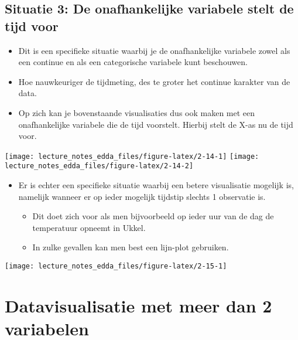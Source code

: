 \documentclass[]{memoir}
\providecommand{\tightlist}{%
  \setlength{\itemsep}{0pt}\setlength{\parskip}{0pt}}
\begin{document}
\subsection{Situatie 3: De onafhankelijke variabele stelt de tijd
voor}\label{situatie-3-de-onafhankelijke-variabele-stelt-de-tijd-voor}

\begin{itemize}
\tightlist
\item
  Dit is een specifieke situatie waarbij je de onafhankelijke variabele
  zowel als een continue en als een categorische variabele kunt
  beschouwen.
\item
  Hoe nauwkeuriger de tijdmeting, des te groter het continue karakter
  van de data.
\item
  Op zich kan je bovenstaande visualisaties dus ook maken met een
  onafhankelijke variabele die de tijd voorstelt. Hierbij stelt de X-as
  nu de tijd voor.
\end{itemize}

\texttt{[image: lecture\_notes\_edda\_files/figure-latex/2-14-1]}
\texttt{[image: lecture\_notes\_edda\_files/figure-latex/2-14-2]}

\begin{itemize}
\tightlist
\item
  Er is echter een specifieke situatie waarbij een betere visualisatie
  mogelijk is, namelijk wanneer er op ieder mogelijk tijdstip slechts 1
  observatie is.

  \begin{itemize}
  \tightlist
  \item
    Dit doet zich voor als men bijvoorbeeld op ieder uur van de dag de
    temperatuur opneemt in Ukkel.
  \item
    In zulke gevallen kan men best een lijn-plot gebruiken.
  \end{itemize}
\end{itemize}

\texttt{[image: lecture\_notes\_edda\_files/figure-latex/2-15-1]}

\section{Datavisualisatie met meer dan 2
variabelen}\label{datavisualisatie-met-meer-dan-2-variabelen}
\end{document}
